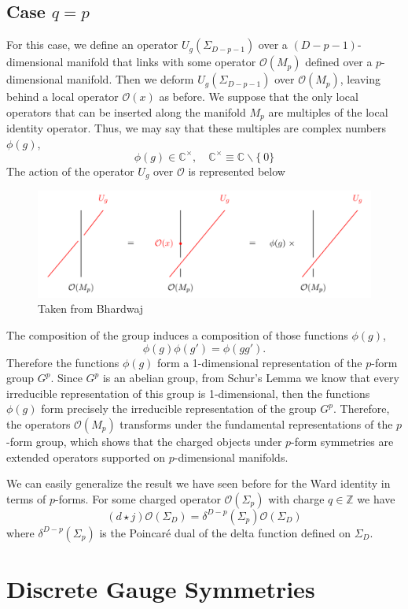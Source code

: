 \documentclass{article}
\begin{document}
\subsection*{Case $q=p$}
For this case, we define an operator $U_g(\Sigma_{D-p-1})$ over a $(D-p-1)$-dimensional manifold that links with some operator  $\mathcal{O}(M_p)$ defined over a $p$-dimensional manifold. Then we deform $U_g(\Sigma_{D-p-1})$  over $\mathcal{O}(M_p)$, leaving behind a local operator $\mathcal{O}(x)$ as before. We suppose that the only local operators that can be inserted along the manifold $M_p$ are multiples of the local identity operator. Thus, we may say that these multiples are complex numbers $\phi(g)$,  
$$
\phi(g)\in \mathbb{C}^{\times},\quad \mathbb{C}^{\times}\equiv \mathbb{C}\backslash\{\ 0 \}
$$
The action of the operator $U_g$ over $\mathcal{O}$ is represented below 
\begin{figure}[h]
	\centering
	\includegraphics[scale=0.4]{figures/linking2.png}
	\caption{Taken from Bhardwaj}
\end{figure}
The composition of the group induces a composition of those functions $\phi(g)$, 
$$
\phi(g)\phi(g')=\phi(gg').
$$
Therefore the functions $\phi(g)$ form a 1-dimensional representation of the $p$-form group $G^p$.  Since $G^p$ is an abelian group, from Schur’s Lemma we know that every irreducible representation of this group is 1-dimensional, then the functions $\phi(g)$ form precisely the irreducible representation of the group $G^p$. Therefore, the operators $\mathcal{O}(M_p)$ transforms under the fundamental representations of the $p$-form group, which shows that the charged objects under $p$-form symmetries are extended operators supported on $p$-dimensional manifolds. 

We can easily generalize the result we have seen before for the Ward identity in terms of $p$-forms. For some  charged operator $\mathcal{O}(\Sigma_p)$ with charge $q\in\mathbb{Z}$ we have
$$
(d\star j)\mathcal{O}(\Sigma_D)=\delta^{D-p}(\Sigma_p)\mathcal{O}(\Sigma_D)
$$
where $\delta^{D-p}(\Sigma_p)$  is the Poincaré dual of the delta function defined on $\Sigma_D$.
\section*{Discrete Gauge Symmetries }
\end{document}
